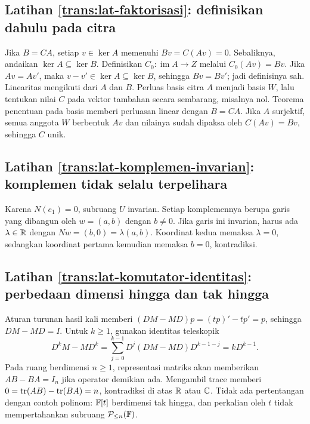 \subsection*{Latihan \ref{trans:lat-faktorisasi}: definisikan dahulu pada citra}
Jika $B=CA$, setiap $v\in\ker A$ memenuhi $Bv=C(Av)=0$.
Sebaliknya, andaikan $\ker A\subseteq\ker B$.
Definisikan $C_0:\operatorname{im}A\to Z$ melalui
$C_0(Av)=Bv$.
Jika $Av=Av'$, maka $v-v'\in\ker A\subseteq\ker B$,
sehingga $Bv=Bv'$; jadi definisinya sah.
Linearitas mengikuti dari $A$ dan $B$.
Perluas basis citra $A$ menjadi basis $W$, lalu tentukan
nilai $C$ pada vektor tambahan secara sembarang, misalnya nol.
Teorema penentuan pada basis memberi perluasan linear dengan $B=CA$.
Jika $A$ surjektif, semua anggota $W$ berbentuk $Av$ dan
nilainya sudah dipaksa oleh $C(Av)=Bv$, sehingga $C$ unik.

\subsection*{Latihan \ref{trans:lat-komplemen-invarian}: komplemen tidak selalu terpelihara}
Karena $N(e_1)=0$, subruang $U$ invarian.
Setiap komplemennya berupa garis yang dibangun oleh
$w=(a,b)$ dengan $b\ne0$.
Jika garis ini invarian, harus ada $\lambda\in\mathbb{R}$ dengan
$Nw=(b,0)=\lambda(a,b)$.
Koordinat kedua memaksa $\lambda=0$, sedangkan koordinat
pertama kemudian memaksa $b=0$, kontradiksi.

\subsection*{Latihan \ref{trans:lat-komutator-identitas}: perbedaan dimensi hingga dan tak hingga}
Aturan turunan hasil kali memberi
$(DM-MD)p=(tp)'-tp'=p$, sehingga $DM-MD=I$.
Untuk $k\ge1$, gunakan identitas teleskopik
\[
    D^kM-MD^k
      =\sum_{j=0}^{k-1}D^j(DM-MD)D^{k-1-j}
      =kD^{k-1}.
\]
Pada ruang berdimensi $n\ge1$, representasi matriks akan
memberikan $AB-BA=I_n$ jika operator demikian ada.
Mengambil trace memberi $0=\operatorname{tr}(AB)-\operatorname{tr}(BA)=n$, kontradiksi
di atas $\mathbb{R}$ atau $\mathbb{C}$.
Tidak ada pertentangan dengan contoh polinom: $\mathbb{F}[t]$
berdimensi tak hingga, dan perkalian oleh $t$ tidak mempertahankan
subruang $\mathcal P_{\le n}(\mathbb{F})$.
\fi
